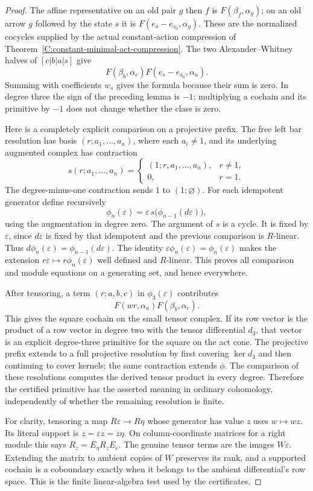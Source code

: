\begin{proof}
The affine representative on an old pair $g$ then $f$ is
$F(\beta_f,\alpha_g)$; on an old arrow $g$ followed by the state
$s$ it is $F(e_s-e_{s_0},\alpha_g)$.
These are the normalized cocycles supplied by the actual
constant-action compression of
Theorem~\ref{C:constant-minimal-act-compression}.
The two Alexander--Whitney halves of
$[c|b|a|s]$ give
\[
 F(\beta_b,\alpha_c)F(e_s-e_{s_0},\alpha_a).
\]
Summing with coefficients $w_s$ gives the formula because their
sum is zero.  In degree three the sign of the preceding lemma is
$-1$; multiplying a cochain and its primitive by $-1$ does not
change whether the class is zero.

Here is a completely explicit comparison on a projective prefix.
The free left bar resolution has basis $(r;a_1,\ldots,a_n)$,
where each $a_i\ne1$, and its underlying augmented complex has
contraction
\[
 s(r;a_1,\ldots,a_n)=
 \begin{cases}(1;r,a_1,\ldots,a_n),&r\ne1,\\0,&r=1.
 \end{cases}
\]
The degree-minus-one contraction sends $1$ to $(1;\varnothing)$.
For each idempotent generator define recursively
\[
 \phi_n(\varepsilon)
   =\varepsilon\,s\bigl(\phi_{n-1}(d\varepsilon)\bigr),
\]
using the augmentation in degree zero.
The argument of $s$ is a cycle.  It is fixed by $\varepsilon$,
since $d\varepsilon$ is fixed by that idempotent and the previous
comparison is $R$-linear.  Thus
$d\phi_n(\varepsilon)=\phi_{n-1}(d\varepsilon)$.
The identity
$\varepsilon\phi_n(\varepsilon)=\phi_n(\varepsilon)$ makes the
extension $r\varepsilon\mapsto r\phi_n(\varepsilon)$ well defined
and $R$-linear.  This proves all comparison and module equations
on a generating set, and hence everywhere.

After tensoring, a term $(r;a,b,c)$ in
$\phi_3(\varepsilon)$ contributes
\[
 F(wr,\alpha_a)F(\beta_b,\alpha_c).
\]
This gives the square cochain on the small tensor complex.
If its row vector is the product of a row vector in degree two
with the tensor differential $d_3$, that vector is an explicit
degree-three primitive for the square on the act cone.
The projective prefix extends to a full projective resolution by
first covering $\ker d_3$ and then continuing to cover kernels;
the same contraction extends
$\phi$.  The comparison of these resolutions computes the derived
tensor product in every degree.  Therefore the certified primitive
has the asserted meaning in ordinary cohomology, independently of
whether the remaining resolution is finite.

For clarity, tensoring a map
$R\varepsilon\to R\eta$ whose generator has value $z$ uses
$w\mapsto wz$.  Its literal support is
$z=\varepsilon z=z\eta$.
On column-coordinate matrices for a right module this says
$R_z=E_\eta R_z E_\varepsilon$.
The genuine tensor terms are the images $W\varepsilon$.
Extending the matrix to ambient copies of $W$ preserves its rank,
and a supported cochain is a coboundary exactly when it belongs
to the ambient differential's row space.  This is the finite
linear-algebra test used by the certificates.
\end{proof}

